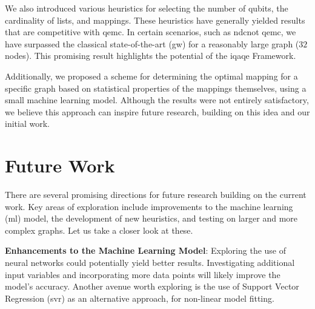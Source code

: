 We also introduced various heuristics for selecting the number of qubits, the cardinality of lists, and mappings. These heuristics have generally yielded results that are competitive with \acrshort{qemc}. In certain scenarios, such as \acrshort{ndcnot} \acrshort{qemc}, we have surpassed the classical state-of-the-art (\acrshort{gw}) for a reasonably large graph ($32$ nodes). This promising result highlights the potential of the \acrshort{iqaqe} Framework. %

Additionally, we proposed a scheme for determining the optimal mapping for a specific graph based on statistical properties of the mappings themselves, using a small machine learning model. Although the results were not entirely satisfactory, we believe this approach can inspire future research, building on this idea and our initial work. %


\section{Future Work}
\label{section:future}
There are several promising directions for future research building on the current work. Key areas of exploration include improvements to the machine learning (\acrshort{ml}) model, the development of new heuristics, and testing on larger and more complex graphs. Let us take a closer look at these.
\vspace{5mm}

\noindent\textbf{Enhancements to the Machine Learning Model}: %
\noindent Exploring the use of neural networks could potentially yield better results. Investigating additional input variables and incorporating more data points will likely improve the model's accuracy. Another avenue worth exploring is the use of Support Vector Regression (\acrshort{svr}) as an alternative approach, for non-linear model fitting.
\vspace{5mm}

